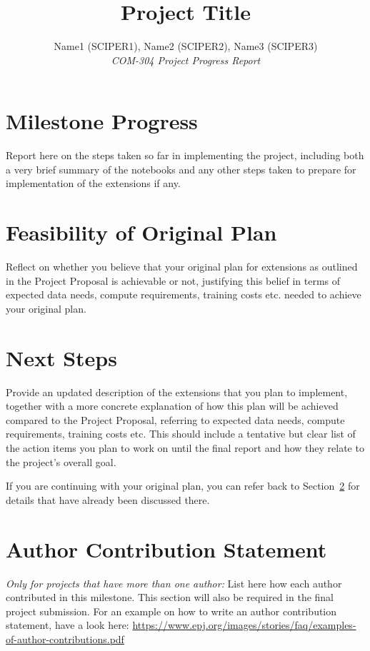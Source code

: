 \documentclass[10pt,conference,compsocconf]{IEEEtran}
\begin{document}
\title{Project Title}

\author{
  Name1 (SCIPER1), Name2 (SCIPER2), Name3 (SCIPER3)\\
  \textit{COM-304 Project Progress Report}
}

\maketitle


\section{Milestone Progress}
Report here on the steps taken so far in implementing the project, including both a very brief summary of the notebooks and any other steps taken to prepare for implementation of the extensions if any.


\section{Feasibility of Original Plan}
\label{sec:feasibility}
Reflect on whether you believe that your original plan for extensions as outlined in the Project Proposal is achievable or not, justifying this belief in terms of expected data needs, compute requirements, training costs etc. needed to achieve your original plan.


\section{Next Steps}
Provide an updated description of the extensions that you plan to implement, together with a more concrete explanation of how this plan will be achieved compared to the Project Proposal, referring to expected data needs, compute requirements, training costs etc. This should include a tentative but clear list of the action items you plan to work on until the final report and how they relate to the project’s overall goal. 

If you are continuing with your original plan, you can refer back to Section~\ref{sec:feasibility} for details that have already been discussed there.


\section{Author Contribution Statement}
\textit{Only for projects that have more than one author:}
List here how each author contributed in this milestone. This section will also be required in the final project submission. For an example on how to write an author contribution statement, have a look here: \url{https://www.epj.org/images/stories/faq/examples-of-author-contributions.pdf}


%
%
\end{document}
